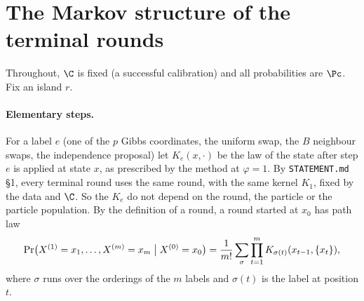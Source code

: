 \documentclass[11pt]{report}
\begin{document}
\section{The Markov structure of the terminal rounds}

Throughout, $\C$ is fixed (a successful calibration) and all probabilities are $\Pc$. Fix an island $r$.

\paragraph{Elementary steps.} For a label $e$ (one of the $p$ Gibbs coordinates, the uniform swap, the $B$ neighbour swaps, the independence proposal) let $K_e(x,\cdot)$ be the law of the state after step $e$ is applied at state $x$, as prescribed by the method at $\varphi=1$. By \texttt{STATEMENT.md} \S1, every terminal round uses the same round, with the same kernel $K_1$, fixed by the data and $\C$. So the $K_e$ do not depend on the round, the particle or the particle population. By the definition of a round, a round started at $x_0$ has path law
\begin{equation}\label{T23:eq:pathlaw}
\Pr\bigl(X^{(1)}=x_1,\dots,X^{(m)}=x_m\bigm|X^{(0)}=x_0\bigr)=\frac1{m!}\sum_{\sigma}\prod_{t=1}^m K_{\sigma(t)}(x_{t-1},\{x_t\}),
\end{equation}
where $\sigma$ runs over the orderings of the $m$ labels and $\sigma(t)$ is the label at position $t$.
\end{document}
